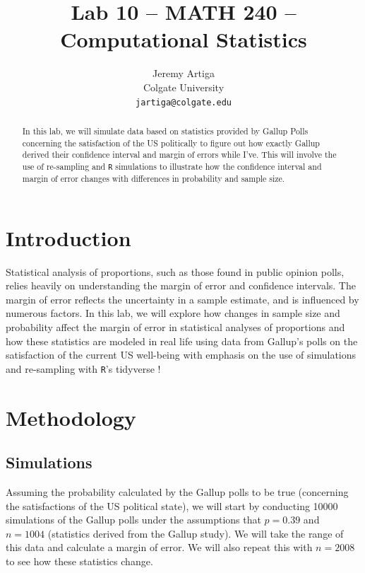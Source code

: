 \documentclass{article}\usepackage[]{graphicx}\usepackage[]{xcolor}
\begin{document}
\vspace{-1in}
\title{Lab 10 -- MATH 240 -- Computational Statistics}

\author{
  Jeremy Artiga \\
  Colgate University  \\
  {\tt jartiga@colgate.edu}
}

\date{}

\maketitle

\begin{multicols}{2}

\begin{abstract}
In this lab, we will simulate data based on statistics provided by Gallup Polls concerning the satisfaction of the US politically to figure out how exactly Gallup derived their confidence interval and margin of errors while I've. This will involve the use of re-sampling and \texttt{R} simulations to illustrate how the confidence interval and margin of error changes with differences in probability and sample size.
\end{abstract}

\section{Introduction}
Statistical analysis of proportions, such as those found in public opinion polls, relies heavily on understanding the margin of error and confidence intervals. The margin of error reflects the uncertainty in a sample estimate, and is influenced by numerous factors. In this lab, we will explore how changes in sample size and probability affect the margin of error in statistical analyses of proportions and how these statistics are modeled in real life using data from Gallup's \citep{gallup2025} polls on the satisfaction of the current US well-being with emphasis on the use of simulations and re-sampling with \texttt{R}'s tidyverse \citep{tidyverse}!

\section{Methodology}
\subsection{Simulations}
Assuming the probability calculated by the Gallup polls to be true (concerning the satisfactions of the US political state), we will start by conducting 10000 simulations of the Gallup polls under the assumptions that $p = 0.39$ and $n = 1004$ (statistics derived from the Gallup study). We will take the range of this data and calculate a margin of error. We will also repeat this with $n= 2008$ to see how these statistics change. \\


\end{multicols}
\end{document}

